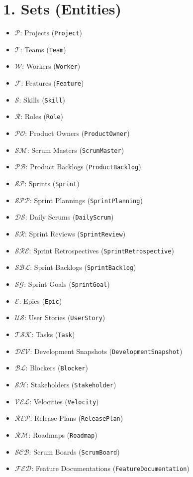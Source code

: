 \documentclass[11pt,a4paper]{article}
\begin{document}
\section{1. Sets (Entities)}
\begin{itemize}[leftmargin=*]
  \item $\mathcal{P}$: Projects (\texttt{Project})
  \item $\mathcal{T}$: Teams (\texttt{Team})
  \item $\mathcal{W}$: Workers (\texttt{Worker})
  \item $\mathcal{F}$: Features (\texttt{Feature})
  \item $\mathcal{S}$: Skills (\texttt{Skill})
  \item $\mathcal{R}$: Roles (\texttt{Role})
  \item $\mathcal{PO}$: Product Owners (\texttt{ProductOwner})
  \item $\mathcal{SM}$: Scrum Masters (\texttt{ScrumMaster})
  \item $\mathcal{PB}$: Product Backlogs (\texttt{ProductBacklog})
  \item $\mathcal{SP}$: Sprints (\texttt{Sprint})
  \item $\mathcal{SPP}$: Sprint Plannings (\texttt{SprintPlanning})
  \item $\mathcal{DS}$: Daily Scrums (\texttt{DailyScrum})
  \item $\mathcal{SR}$: Sprint Reviews (\texttt{SprintReview})
  \item $\mathcal{SRE}$: Sprint Retrospectives (\texttt{SprintRetrospective})
  \item $\mathcal{SBL}$: Sprint Backlogs (\texttt{SprintBacklog})
  \item $\mathcal{SG}$: Sprint Goals (\texttt{SprintGoal})
  \item $\mathcal{E}$: Epics (\texttt{Epic})
  \item $\mathcal{US}$: User Stories (\texttt{UserStory})
  \item $\mathcal{TSK}$: Tasks (\texttt{Task})
  \item $\mathcal{DEV}$: Development Snapshots (\texttt{DevelopmentSnapshot})
  \item $\mathcal{BL}$: Blockers (\texttt{Blocker})
  \item $\mathcal{SH}$: Stakeholders (\texttt{Stakeholder})
  \item $\mathcal{VEL}$: Velocities (\texttt{Velocity})
  \item $\mathcal{REP}$: Release Plans (\texttt{ReleasePlan})
  \item $\mathcal{RM}$: Roadmaps (\texttt{Roadmap})
  \item $\mathcal{SCB}$: Scrum Boards (\texttt{ScrumBoard})
  \item $\mathcal{FED}$: Feature Documentations (\texttt{FeatureDocumentation})
\end{itemize}
\end{document}
